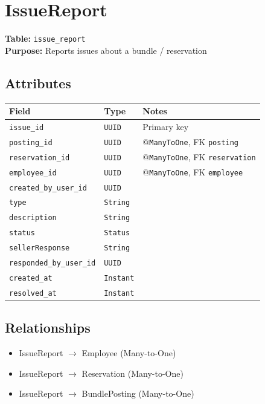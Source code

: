 \documentclass[a4paper,11pt]{article}
\begin{document}
\section{IssueReport}

\textbf{Table:} \texttt{issue\_report} \\
\textbf{Purpose:} Reports issues about a bundle / reservation



\subsection*{Attributes}
\begin{longtable}{|p{4cm}|p{3cm}|p{6cm}|}
\hline
\textbf{Field} & \textbf{Type} & \textbf{Notes} \\
\hline
\texttt{issue\_id} & \texttt{UUID} & Primary key \\
\texttt{posting\_id} & \texttt{UUID} & @\texttt{ManyToOne}, FK \texttt{posting} \\
\texttt{reservation\_id} & \texttt{UUID} & @\texttt{ManyToOne}, FK \texttt{reservation} \\
\texttt{employee\_id} & \texttt{UUID} & @\texttt{ManyToOne}, FK \texttt{employee} \\
\texttt{created\_by\_user\_id} & \texttt{UUID} &  \\
\texttt{type} & \texttt{String} &  \\
\texttt{description} & \texttt{String} &  \\
\texttt{status} & \texttt{Status} &  \\
\texttt{sellerResponse} & \texttt{String} &  \\
\texttt{responded\_by\_user\_id} & \texttt{UUID} &  \\
\texttt{created\_at} & \texttt{Instant} &  \\
\texttt{resolved\_at} & \texttt{Instant} &  \\
\hline
\end{longtable}

\subsection*{Relationships}
\begin{itemize}
  \item IssueReport $\rightarrow$ Employee (Many-to-One)
  \item IssueReport $\rightarrow$ Reservation (Many-to-One)
  \item IssueReport $\rightarrow$ BundlePosting (Many-to-One)

\end{itemize}
\end{document}
